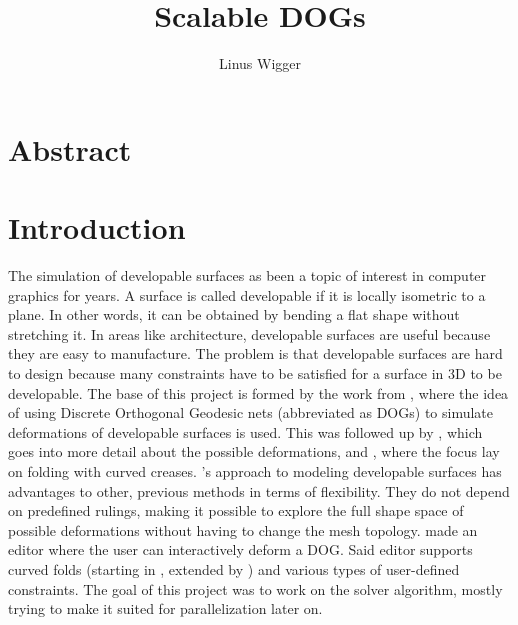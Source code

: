 \documentclass[a4paper,twoside,12pt,nochapterprefix]{scrbook}
\title{Scalable DOGs}
\author{Linus Wigger}
\begin{document}
\maketitle

\chapter{Abstract}\label{sec:abstract}
\chapter{Introduction}\label{sec:intro}\label{sec:prev_work}
The simulation of developable surfaces as been a topic of interest in computer graphics for years. A surface is called developable if it is locally isometric to a plane. In other words, it can be obtained by bending a flat shape without stretching it. In areas like architecture, developable surfaces are useful because they are easy to manufacture. The problem is that developable surfaces are hard to design because many constraints have to be satisfied for a surface in 3D to be developable.\newline
The base of this project is formed by the work from \cite{Rabinovich:DogNets:2018}, where the idea of using Discrete Orthogonal Geodesic nets (abbreviated as DOGs) to simulate deformations of developable surfaces is used. This was followed up by \cite{Rabinovich:DogShapeSpace:2018}, which goes into more detail about the possible deformations, and \cite{Rabinovich:CurvedFolds:2019}, where the focus lay on folding with curved creases.\newline
\cite{Rabinovich:DogNets:2018}'s approach to modeling developable surfaces has advantages to other, previous methods in terms of flexibility. They do not depend on predefined rulings, making it possible to explore the full shape space of possible deformations without having to change the mesh topology.\newline %
\cite{Rabinovich:DogNets:2018} made an editor where the user can interactively deform a DOG. Said editor supports curved folds (starting in \cite{Rabinovich:DogShapeSpace:2018}, extended by \cite{Rabinovich:CurvedFolds:2019}) and various types of user-defined constraints. The goal of this project was to work on the solver algorithm, mostly trying to make it suited for parallelization later on.\newline
\end{document}
